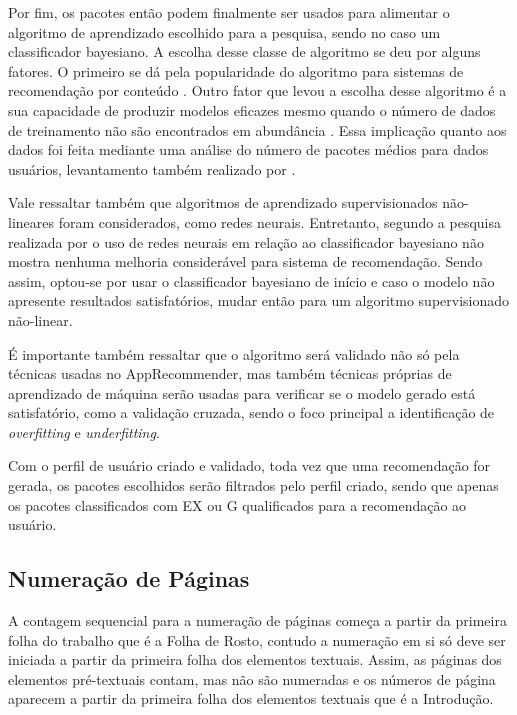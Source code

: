Por fim, os pacotes então podem finalmente ser usados para alimentar o algoritmo de aprendizado escolhido para a pesquisa, sendo no caso um
classificador bayesiano. A escolha desse classe de algoritmo se deu por alguns fatores. O primeiro se dá pela popularidade do algoritmo para
sistemas de recomendação por conteúdo \cite{amatriain2011data}. Outro fator que levou a escolha desse algoritmo é a sua capacidade de produzir
modelos eficazes mesmo quando o número de dados de treinamento não são encontrados em abundância \cite{segaran2007programming}. Essa implicação
quanto aos dados foi feita mediante uma análise do número de pacotes médios para dados usuários, levantamento também realizado por \cite{araujo2011apprecommender}.

Vale ressaltar também que algoritmos de aprendizado supervisionados não-lineares foram considerados, como redes neurais. Entretanto, segundo
a pesquisa realizada por \cite{pazzani1997learning} o uso de redes neurais em relação ao classificador bayesiano não mostra nenhuma melhoria
considerável para sistema de recomendação. Sendo assim, optou-se por usar o classificador bayesiano de início e caso o modelo não apresente
resultados satisfatórios, mudar então para um algoritmo supervisionado não-linear.

É importante também ressaltar que o algoritmo será validado não só pela técnicas usadas no AppRecommender, mas também técnicas próprias de
aprendizado de máquina serão usadas para verificar se o modelo gerado está satisfatório, como a validação cruzada, sendo o foco principal a
identificação de \textit{overfitting} e \textit{underfitting}.

Com o perfil de usuário criado e validado, toda vez que uma recomendação for gerada, os pacotes escolhidos serão filtrados pelo perfil criado,
sendo que apenas os pacotes classificados com EX ou G qualificados para a recomendação ao usuário.


\subsection{Numeração de Páginas}

A contagem sequencial para a numeração de páginas começa a partir da
primeira folha do trabalho que é a Folha de Rosto, contudo a numeração em
si só deve ser iniciada a partir da primeira folha dos elementos textuais.
Assim, as páginas dos elementos pré-textuais contam, mas não são numeradas
e os números de página aparecem a partir da primeira folha dos elementos
textuais que é a Introdução.

